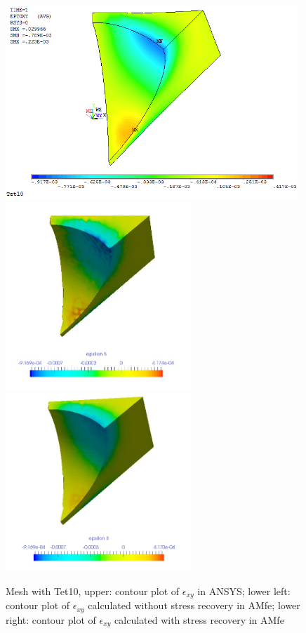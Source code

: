 \begin{figure}[htbp]
	\begin{center}
		\includegraphics[width=11cm,clip]{Tet10_Exy.png} 	
		\includegraphics[width=7cm,clip]{Tet10_Exy_PD.png} 		
		\includegraphics[width=7cm,clip]{Tet10_Exy_P.png} 		
		\caption{Mesh with Tet10, upper: contour plot of $\epsilon_{xy}$ in ANSYS; lower left: contour plot of $\epsilon_{xy}$ calculated without stress recovery in AMfe; lower right: contour plot of $\epsilon_{xy}$ calculated with stress recovery in AMfe} \label{fig: Tet10_Exy}
	\end{center}
\end{figure}
\clearpage 

